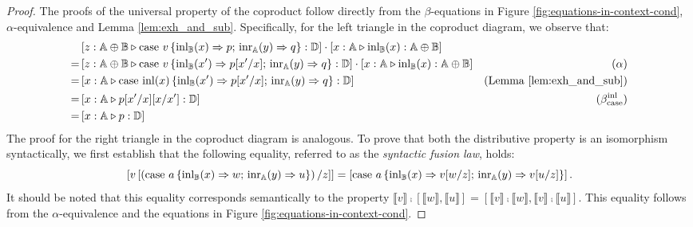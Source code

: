 \documentclass[10pt,a4paper]{amsart}
\theoremstyle{definition}
\theoremstyle{definition}
\theoremstyle{definition}
\theoremstyle{definition}
\theoremstyle{definition}
\theoremstyle{definition}
\begin{document}
\begin{proof}
  The proofs of the universal property of the coproduct follow directly from the $\beta$-equations in Figure \ref{fig:equations-in-context-cond}, $\alpha$-equivalence and Lemma \ref{lem:exh_and_sub}. Specifically, for the left triangle in the coproduct diagram, we observe that:
  \begin{align*}
    & \left[z:\mathbb{A} \oplus \mathbb{B}  \triangleright \text{case } v\,\{\mathrm{inl}_{\mathbb{B}}(x) \Rightarrow p ; \, \mathrm{inr}_{\mathbb{A}}(y) \Rightarrow q\}: \mathbb{D}\right] \cdot \left[ x: \mathbb{A}\triangleright \mathrm{inl}_{\mathbb{B}}(x): \mathbb{A} \oplus \mathbb{B} \right] \\
    = &   \left[z:\mathbb{A} \oplus \mathbb{B}  \triangleright \text{case } v\,\{\mathrm{inl}_{\mathbb{B}}(x') \Rightarrow p[x'/ x] ; \, \mathrm{inr}_{\mathbb{A}}(y) \Rightarrow q\}: \mathbb{D}\right] \cdot \left[ x: \mathbb{A}\triangleright \mathrm{inl}_{\mathbb{B}}(x): \mathbb{A} \oplus \mathbb{B}\right] & (\alpha)\\
    = &  \left[x:\mathbb{A} \triangleright \text{case } \mathrm{inl}(x) \,\{\mathrm{inl}_{\mathbb{B}}(x') \Rightarrow p[x'/ x] ; \, \mathrm{inr}_{\mathbb{A}}(y) \Rightarrow q\}: \mathbb{D}\right] & (\text{Lemma } \ref{lem:exh_and_sub})  \\
    = &  \left[x:\mathbb{A} \triangleright p[x'/x][x/x']: \mathbb{D}\right] & (\beta_{\text{case}}^{\text{inl}}) \\
    = &  \left[x:\mathbb{A} \triangleright p: \mathbb{D}\right]  \\
  \end{align*}
  The proof for the right triangle in the coproduct diagram is analogous. 
  To prove that both the distributive property is an isomorphism syntactically, we first establish that the following equality, referred to as the \emph{syntactic fusion law}, holds:
  \begin{equation*}
    \left[v\left[ \left(\text{case } a \,\{\mathrm{inl}_{\mathbb{B}}(x) \Rightarrow w ; \, \mathrm{inr}_{\mathbb{A}}(y) \Rightarrow u\}\right)  / z \right]\right] =   \left[\text{case } a \,\{\mathrm{inl}_{\mathbb{B}}(x) \Rightarrow v[w/z] ; \, \mathrm{inr}_{\mathbb{A}}(y) \Rightarrow v[u/z]\} \right].
  \end{equation*}
It should be noted that this equality corresponds semantically to the property  $ \llbracket v \rrbracket \comp [ \llbracket w \rrbracket,  \llbracket u \rrbracket] = [ \llbracket v \rrbracket \comp \llbracket w \rrbracket,\llbracket v \rrbracket \comp \llbracket u \rrbracket ] $.
This equality follows from the $\alpha$-equivalence and the equations in Figure \ref{fig:equations-in-context-cond}. 


\end{proof}
\end{document}
